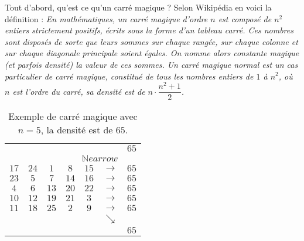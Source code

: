 \exer{}
\setcounter{numques}{0}



\begin{table}[htbp]
\begin{minipage}{0.5\textwidth}
Tout d'abord, qu'est ce qu'un carré magique ? Selon Wikipédia en voici la définition :
\textsl{\og En mathématiques, un carré magique d'ordre $n$ est composé de $n^2$ entiers strictement positifs, écrits sous la forme d'un tableau carré. Ces nombres sont disposés de sorte que leurs sommes sur chaque rangée, sur chaque colonne et sur chaque diagonale principale soient égales. On nomme alors constante magique (et parfois densité) la valeur de ces sommes. Un carré magique normal est un cas particulier de carré magique, constitué de tous les nombres entiers de $1$ à $n^2$, où $n$ est l'ordre du carré, sa densité est de $n\cdot\dfrac{n^2+1}{2}$.\fg}
\end{minipage}
\begin{minipage}{0.5\textwidth}
\renewcommand{\arraystretch}{1.5}

	\centering
		\begin{tabular}{|*{5}{c|}cc}
			\multicolumn{6}{r}{}                &$65$\\
		  \multicolumn{6}{r}{$\mathbb{N}earrow$}      &   \\
			\cline{1-5}
			$17$&$24$&$1$&$8$&$15$&$\rightarrow$&$65$\\
			\cline{1-5}
			$23$&$5$&$7$&$14$&$16$&$\rightarrow$&$65$\\
			\cline{1-5}
			$4$&$6$&$13$&$20$&$22$&$\rightarrow$&$65$\\
			\cline{1-5}
			$10$&$12$&$19$&$21$&$3$&$\rightarrow$&$65$\\
			\cline{1-5}
			$11$&$18$&$25$&$2$&$9$&$\rightarrow$&$65$\\
			\cline{1-5}
			\multicolumn{6}{r}{$\searrow$}      &   \\
			\multicolumn{6}{r}{}                &$65$\\
		  
		\end{tabular}
		\caption{Exemple de carré magique avec $n=5$, la densité est de $65$.}
\end{minipage}
\end{table}
\renewcommand{\arraystretch}{1}



